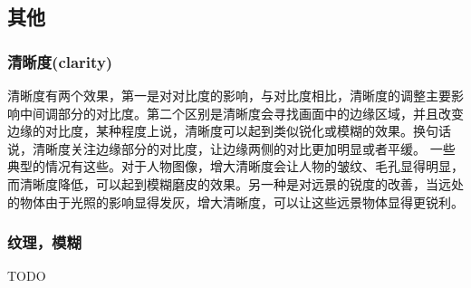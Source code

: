 \documentclass{ctexart}
\begin{document}
\subsection{其他}
\subsubsection{清晰度(clarity)}
清晰度有两个效果，第一是对对比度的影响，与对比度相比，清晰度的调整主要影响中间调部分的对比度。第二个区别是清晰度会寻找画面中的边缘区域，并且改变边缘的对比度，某种程度上说，清晰度可以起到类似锐化或模糊的效果。换句话说，清晰度关注边缘部分的对比度，让边缘两侧的对比更加明显或者平缓。
一些典型的情况有这些。对于人物图像，增大清晰度会让人物的皱纹、毛孔显得明显，而清晰度降低，可以起到模糊磨皮的效果。另一种是对远景的锐度的改善，当远处的物体由于光照的影响显得发灰，增大清晰度，可以让这些远景物体显得更锐利。
\subsubsection{纹理，模糊}
TODO


\end{document}
